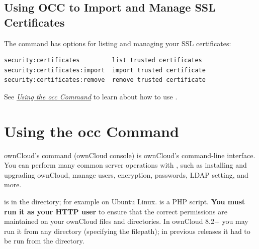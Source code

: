 \documentclass[letterpaper,10pt,english]{sphinxmanual}
\begin{document}
\subsection{Using OCC to Import and Manage SSL Certificates}
\label{configuration_server/import_ssl_cert:using-occ-to-import-and-manage-ssl-certificates}
The  command has options for listing and managing your SSL certificates:

\begin{Verbatim}[commandchars=\\\{\}]
security:certificates         list trusted certificates
security:certificates:import  import trusted certificate
security:certificates:remove  remove trusted certificate
\end{Verbatim}

See {\hyperref[configuration_server/occ_command::doc]{\emph{\emph{Using the occ Command}}}} to learn about how to use .


\section{Using the occ Command}
\label{configuration_server/occ_command:using-the-occ-command}\label{configuration_server/occ_command::doc}
ownCloud's  command (ownCloud console) is ownCloud's command-line
interface. You can perform many common server operations with , such as
installing and upgrading ownCloud, manage users, encryption, passwords, LDAP
setting, and more.

 is in the  directory; for example
 on Ubuntu Linux.  is a PHP script. \textbf{You must
run it as your HTTP user} to ensure that the correct permissions are maintained
on your ownCloud files and directories. In ownCloud 8.2+ you may run it from
any directory (specifying the filepath); in previous releases it had to be
run from the  directory.
\end{document}
